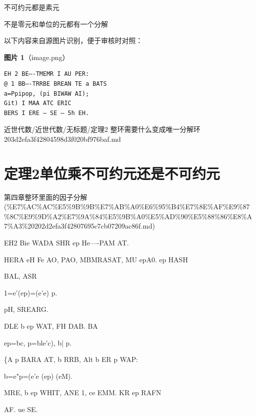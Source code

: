 \begin{theorem}[定理2 整环需要什么变成唯一分解环]

不可约元都是素元

不是零元和单位的元都有一个分解

\end{theorem}

\begin{note}
以下内容来自源图片识别，便于审核时对照：

\textbf{图片 1}（image.png）
\begin{Verbatim}[fontsize=\small]
EH 2 BE—-TMEMR I AU PER:
@ 1 BB—-TRRBE BREAN TE a BATS
a=Ppipop, (pi BIWAW AI);
Git) I MAA ATC ERIC
BERS I ERE — SE — 5h EH.
\end{Verbatim}

\end{note}

\begin{note}[来源路径]

近世代数/近世代数/无标题/定理2 整环需要什么变成唯一分解环 203d2efa3f42804598d3f020bf976baf.md

\end{note}

\section*{定理2单位乘不可约元还是不可约元}

\begin{note}[来源上级主题]

第四章整环里面的因子分解 (\%E7\%AC\%AC\%E5\%9B\%9B\%E7\%AB\%A0\%E6\%95\%B4\%E7\%8E\%AF\%E9\%87\%8C\%E9\%9D\%A2\%E7\%9A\%84\%E5\%9B\%A0\%E5\%AD\%90\%E5\%88\%86\%E8\%A7\%A3\%20202d2efa3f42807695c7cb07209ac86f.md)

\end{note}

\begin{theorem}[定理2单位乘不可约元还是不可约元]

EH2 Bie WADA SHR ep He—-PAM AT.

HERA eH Fe AO, PAO, MBMRASAT, MU epA0. ep HASH

BAL, ASR

1=e’(ep)=(e’e) p.

pH, SREARG.

DLE b ep WAT, FH DAB. BA

ep=bc, p=ble'c), b| p.

\{A p BARA AT, b RRB, Alt b ER p WAP:

b=e"p=(e'e (ep) (eM).

MRE, b ep WHIT, ANE 1, ce EMM. KR ep RAFN

AF. ue SE.

\end{theorem}

